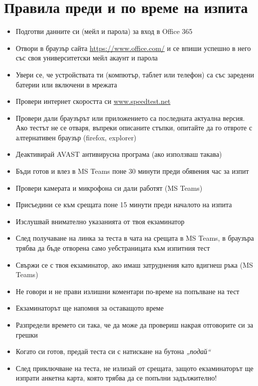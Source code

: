 \documentclass[13pt,a4paper]{article}
\begin{document}
    \section*{Правила преди и по време на изпита}
    \begin{itemize}
        \item Подготви данните си (мейл и парола) за вход в Office 365
        \item Отвори в браузър сайта \href{https://www.office.com/}{https://www.office.com/} и се впиши успешно в него със своя университетски мейл акаунт и парола
        \item Увери се, че устройствата ти (компютър, таблет или телефон) са със заредени батерии или включени в мрежата
        \item Провери интернет скоростта си \href{https://www.speedtest.net/}{www.speedtest.net}
        \item Провери дали браузърът или приложението са последната актуална версия. Ако тестът не се отваря, въпреки описаните стъпки, опитайте да го отвроте с алтернативен браузър (firefox, explorer)
        \item Деактивирай AVAST антивирусна програма (ако използваш такава)
        \item Бъди готов и влез в MS Teams поне 30 минути преди обявения час за изпит
        \item Провери камерата и микрофона си дали работят (MS Teams)
        \item Присъедини се към срещата поне 15 минути преди началото на изпита
        \item Изслушвай внимателно указанията от твоя екзаминатор
        \item След получаване на линка за теста в чата на срещата в MS Teams, в браузъра трябва да бъде отворена само уебстраницата към изпитния тест
        \item Свържи се с твоя екзаминатор, ако имаш затруднения като вдигнеш ръка (MS Teams)
        \item Не говори и не прави излишни коментари по-време на попълване на тест
        \item Екзаминаторът ще напомня за оставащото време
        \item Разпредели времето си така, че да може да провериш накрая отговорите си за грешки
        \item Когато си готов, предай теста си с натискане на бутона \emph{„подай“}
        \item След приключване на теста, не излизай от срещата, защото екзаминаторът ще изпрати анкетна карта, която трябва да се попълни задължително!

\end{itemize}
\end{document}
